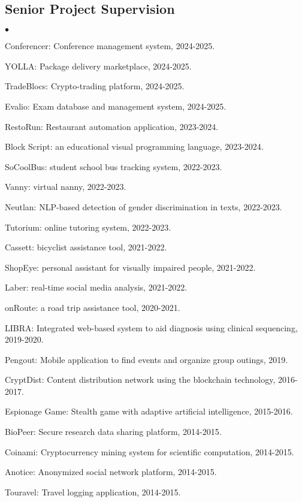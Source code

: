 \documentclass[margin,line]{res}
\newenvironment{list2}{
  \begin{list}{$\bullet$}{%
      \setlength{\itemsep}{0.1cm}
      \setlength{\parsep}{0in} \setlength{\parskip}{0in}
      \setlength{\topsep}{0in} \setlength{\partopsep}{0in} 
      \setlength{\leftmargin}{0.2in}}}{\end{list}}
\begin{document}
\begin{resume}
\subsection{\small \sc Senior Project Supervision}
\begin{list2}
\item Conferencer: Conference management system, 2024-2025.
\item YOLLA: Package delivery marketplace, 2024-2025.
\item TradeBlocs: Crypto-trading platform, 2024-2025.
\item Evalio: Exam database and management system, 2024-2025.
\item RestoRun: Restaurant automation application, 2023-2024.
\item Block Script: an educational visual programming language, 2023-2024.
\item SoCoolBus:  student school bus tracking system, 2022-2023.
\item Vanny: virtual nanny, 2022-2023.
\item Neutlan: NLP-based detection of gender discrimination in texts, 2022-2023.
\item Tutorium: online tutoring system, 2022-2023.
\item Cassett: bicyclist assistance tool, 2021-2022.
\item ShopEye: personal assistant for visually impaired people, 2021-2022.
\item Laber: real-time social media analysis, 2021-2022.
\item onRoute: a road trip assistance tool, 2020-2021.
\item LIBRA: Integrated web-based system to aid diagnosis using clinical sequencing, 2019-2020.
\item Pengout: Mobile application to find events and organize group outings, 2019.
  \item CryptDist: Content distribution network using the blockchain technology, 2016-2017.
\item Espionage Game: Stealth game with adaptive artificial intelligence, 2015-2016.
  \item BioPeer: Secure research data sharing platform, 2014-2015.
  \item Coinami: Cryptocurrency mining system for scientific computation, 2014-2015.
  \item Anotice: Anonymized social network platform, 2014-2015.
  \item Touravel: Travel logging application, 2014-2015. 

\end{list2}
\end{resume}
\end{document}
